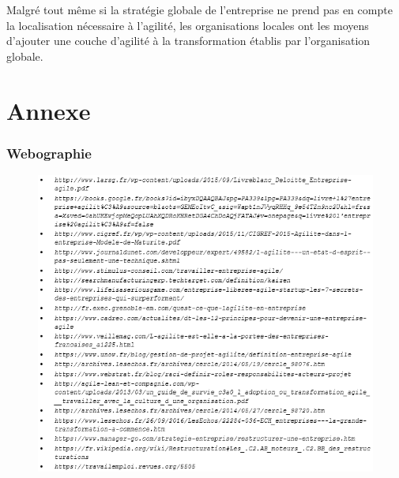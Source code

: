 \documentclass[12pt,a4paper]{article}
\begin{document}
Malgré tout même si la stratégie globale de l’entreprise ne prend pas en compte la localisation nécessaire à l’agilité, les organisations locales ont les moyens d’ajouter une couche d’agilité à la transformation établis par l’organisation globale.


\newpage
{}
\setcounter{page}{1}
\part{Annexe}
\listoffigures
\newpage
\setcounter{section}{0}

\appendix
\section{Webographie}

\vspace{0.5cm}
\vspace{0.3cm}

\begin{figure}[h!]
\includegraphics[scale=1.2]{biblio}
\end{figure}


\end{document}
